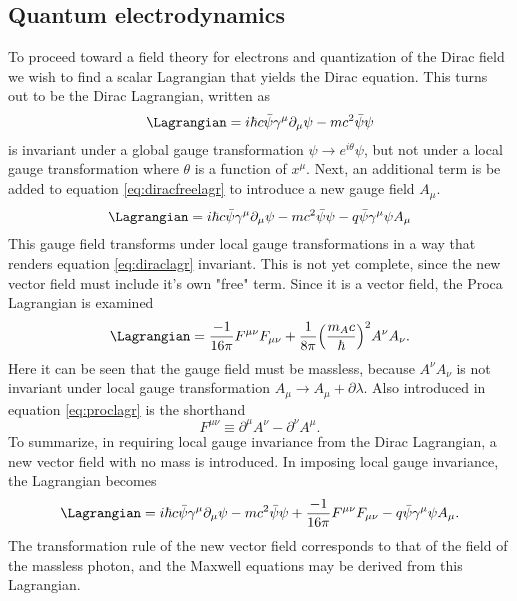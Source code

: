 \subsection{Quantum electrodynamics}
\label{ssec:QED}

To proceed toward a field theory for electrons and quantization of the Dirac field we wish to find a scalar Lagrangian that yields the Dirac equation. This turns out to be the Dirac Lagrangian, written as
\begin{equation} \label{eq:diracfreelagr}
    \Lagrangian=i\hbar c\bar{\psi}\gamma^{\mu}\partial_{\mu}\psi-mc^2\bar{\psi}\psi
\end{equation}
is invariant under a global gauge transformation $\psi\rightarrow e^{i\theta}\psi$, but not under a local gauge transformation where $\theta$ is a function of $x^{\mu}$. Next, an additional term is be added to equation \ref{eq:diracfreelagr} to introduce a new gauge field $A_{\mu}$. 
\begin{equation} \label{eq:diraclagr}
    \Lagrangian=i\hbar c\bar{\psi}\gamma^{\mu}\partial_{\mu}\psi-mc^2\bar{\psi}\psi-q\bar{\psi}\gamma^{\mu}\psi A_{\mu}
\end{equation}
This gauge field transforms under local gauge transformations in a way that renders equation \ref{eq:diraclagr} invariant. This is not yet complete, since the new vector field must include it's own "free" term. Since it is a vector field, the Proca Lagrangian is examined
\begin{equation} \label{eq:proclagr}
    \Lagrangian=\dfrac{-1}{16\pi}F^{\mu\nu}F_{\mu\nu}+\dfrac{1}{8\pi}\Big(\dfrac{m_Ac}{\hbar}\Big)^2 A^{\nu}A_{\nu}.
\end{equation}
Here it can be seen that the gauge field must be massless, because $A^{\nu}A_{\nu}$ is not invariant under local gauge transformation $A_{\mu}\rightarrow A_{\mu}+\partial \lambda$. Also introduced in equation \ref{eq:proclagr} is the shorthand 
\begin{equation}
    F^{\mu\nu}\equiv\partial^{\mu}A^{\nu}-\partial^{\nu}A^{\mu}.
\end{equation}
To summarize, in requiring local gauge invariance from the Dirac Lagrangian, a new vector field with no mass is introduced. In imposing local gauge invariance, the Lagrangian becomes
\begin{equation}\label{eq:QEDlagr}
    \Lagrangian=i\hbar c\bar{\psi}\gamma^{\mu}\partial_{\mu}\psi-mc^2\bar{\psi}\psi+\dfrac{-1}{16\pi}F^{\mu\nu}F_{\mu\nu}-q\bar{\psi}\gamma^{\mu}\psi A_{\mu}.
\end{equation}
The transformation rule of the new vector field corresponds to that of the field of the massless photon, and the Maxwell equations may be derived from this Lagrangian.

